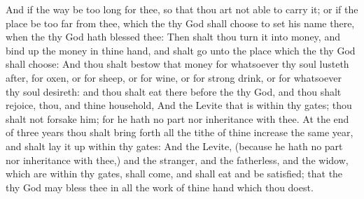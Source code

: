 \begin{biblechapter}
\verse And if the way be too long for thee, so that thou art not able to carry it; or if the place be too far from thee, which the \LORD thy God shall choose to set his name there, when the \LORD thy God hath blessed thee:
\verse Then shalt thou turn it into money, and bind up the money in thine hand, and shalt go unto the place which the \LORD thy God shall choose:
\verse And thou shalt bestow that money for whatsoever thy soul lusteth after, for oxen, or for sheep, or for wine, or for strong drink, or for whatsoever thy soul desireth: and thou shalt eat there before the \LORD thy God, and thou shalt rejoice, thou, and thine household,
\verse And the Levite that is within thy gates; thou shalt not forsake him; for he hath no part nor inheritance with thee.
\verse At the end of three years thou shalt bring forth all the tithe of thine increase the same year, and shalt lay it up within thy gates:
\verse And the Levite, (because he hath no part nor inheritance with thee,) and the stranger, and the fatherless, and the widow, which are within thy gates, shall come, and shall eat and be satisfied; that the \LORD thy God may bless thee in all the work of thine hand which thou doest.
\end{biblechapter}

